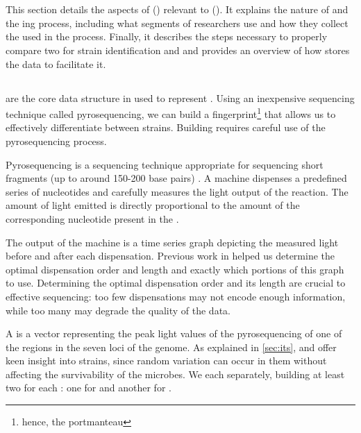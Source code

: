 \section{\cploplong{}}

This section details the aspects of \cploplong{} (\cplop{}) relevant to \mstlong{} (\mst{}).
It explains the nature of \pyros{} and the \pyro{}ing process, including what segments of \ecoli{} \dna{} \cplop{} researchers use and how they collect the \isols{} used in the process.
Finally, it describes the steps necessary to properly compare two \ecoli{} \isols{} for strain identification and \mst{} and provides an overview of how \cplop{} stores the \pyro{} data to facilitate it.

\subsection{\Pyros{}}
\Pyros{} are the core data structure in \cplop{} used to represent \ecoli{} \isols{}.
\index{\pyro{}}
Using an inexpensive \dna{} sequencing technique called pyrosequencing, we can build a fingerprint\footnote{hence, the portmanteau \pyro{}} that allows us to effectively differentiate between \ecoli{} strains.
Building \pyros{} requires careful use of the pyrosequencing process.

Pyrosequencing is a \dna{} sequencing technique appropriate for sequencing short \dna{} fragments (up to around 150-200 base pairs) \cite{ronaghi1998sequencing}.
A machine dispenses a predefined series of nucleotides and carefully measures the light output of the reaction.
The amount of light emitted is directly proportional to the amount of the corresponding nucleotide present in the \dna{}.

The output of the machine is a time series graph depicting the measured light before and after each dispensation.
Previous work in \cite{montana2013algorithms, Shealy:SeniorProject} helped us determine the optimal dispensation order and length and exactly which portions of this graph to use.
Determining the optimal dispensation order and its length are crucial to effective sequencing: too few dispensations may not encode enough information, while too many may degrade the quality of the data.

A \textit{\pyro{}} is a vector representing the peak light values of the pyrosequencing of one of the \itsshort{} regions in the seven loci of the \ecoli{} genome.
\index{\pyro{}}
As explained in \autoref{sec:its}, \Ssixt{} and \Sfive{} offer keen insight into \ecoli{} strains, since random variation can occur in them without affecting the survivability of the \ecoli{} microbes.
We \pyro{} each \itsshort{} separately, building at least two \pyros{} for each \isol{}: one for \Ssixt{} and another for \Sfive{}.

